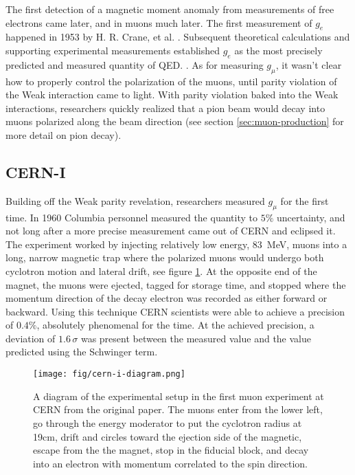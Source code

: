 The first detection of a magnetic moment anomaly from measurements of free electrons came later, and in muons much later.  The first measurement of $g_e$ happened in 1953 by H. R. Crane, et al. .  Subsequent theoretical calculations and supporting experimental measurements established $g_e$ as the most precisely predicted and measured quantity of QED.  .  As for measuring $g_\mu$, it wasn't clear how to properly control the polarization of the muons, until parity violation of the Weak interaction came to light.  With parity violation baked into the Weak interactions, researchers quickly realized that a pion beam would decay into muons polarized along the beam direction (see section \ref{sec:muon-production} for more detail on pion decay).

\subsection{CERN-I}
Building off the Weak parity revelation, researchers measured $g_\mu$ for the first time.  In 1960 Columbia personnel measured the quantity to $5\%$ uncertainty, and not long after a more precise measurement came out of CERN and eclipsed it.  The experiment worked by injecting relatively low energy, \SI{83}{\MeV}, muons into a long, narrow magnetic trap where the polarized muons would undergo both cyclotron motion and lateral drift, see figure \ref{fig:cern-i-diagram}. At the opposite end of the magnet, the muons were ejected, tagged for storage time, and stopped where the momentum direction of the decay electron was recorded as either forward or backward.  Using this technique CERN scientists were able to achieve a precision of $0.4\%$, absolutely phenomenal for the time\cite{cern-i}.  At the achieved precision, a deviation of $1.6\,\sigma$ was present between the measured value and the value predicted using the Schwinger term\cite{47y-muon-g-2}.

\begin{figure}
\centering
\texttt{[image: fig/cern-i-diagram.png]}
\label{fig:cern-i-diagram}
\caption{A diagram of the experimental setup in the first muon \gmtwo experiment at CERN from the original paper\cite{cern-i}. The muons enter from the lower left, go through the energy moderator to put the cyclotron radius at 19cm, drift and circles toward the ejection side of the magnetic, escape from the the magnet, stop in the fiducial block, and decay into an electron with momentum correlated to the spin direction.}
\end{figure}

